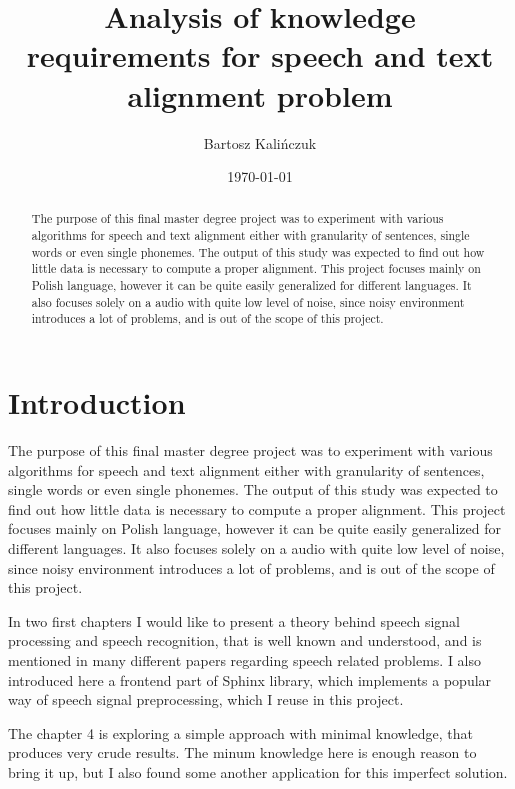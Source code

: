 \documentclass[12pt,a4paper,english]{article}
\begin{document}
\title{Analysis of knowledge requirements for speech and text alignment problem}
\author{Bartosz Kalińczuk}
\date{\today}
\maketitle

\newpage
\begin{abstract}
The purpose of this final master degree project was to experiment with various algorithms for speech and text alignment either with granularity of sentences, single words or even single phonemes. The output of this study was expected to find out how little data is necessary to compute a proper alignment. This project focuses mainly on Polish language, however it can be quite easily generalized for different languages. It also focuses solely on a audio with quite low level of noise, since noisy environment introduces a lot of problems, and is out of the scope of this project.
\end{abstract}


\newpage
\setcounter{tocdepth}{2}
\tableofcontents

\newpage
\section{Introduction}

The purpose of this final master degree project was to experiment with various algorithms for speech and text alignment either with granularity of sentences, single words or even single phonemes. The output of this study was expected to find out how little data is necessary to compute a proper alignment. This project focuses mainly on Polish language, however it can be quite easily generalized for different languages. It also focuses solely on a audio with quite low level of noise, since noisy environment introduces a lot of problems, and is out of the scope of this project. \newline

In two first chapters I would like to present a theory behind speech signal processing and speech recognition,
that is well known and understood, and is mentioned in many different papers regarding speech related problems. I also introduced here a frontend part of Sphinx library, which implements a popular way of speech signal preprocessing, which I reuse in this project. \newline

The chapter 4 is exploring a simple approach with minimal knowledge, that produces very crude results. The minum knowledge here is enough reason to bring it up, but I also found some another application for this imperfect solution. \newline
\end{document}
